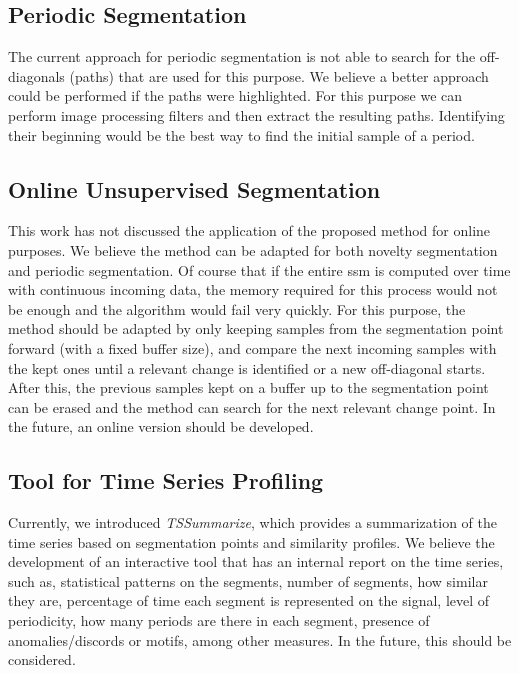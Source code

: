\subsection{Periodic Segmentation}

The current approach for periodic segmentation is not able to search for the off-diagonals (paths) that are used for this purpose. We believe a better approach could be performed if the paths were highlighted. For this purpose we can perform image processing filters and then extract the resulting paths. Identifying their beginning would be the best way to find the initial sample of a period. 

\subsection{Online Unsupervised Segmentation}

This work has not discussed the application of the proposed method for online purposes. We believe the method can be adapted for both novelty segmentation and periodic segmentation. Of course that if the entire \gls{ssm} is computed over time with continuous incoming data, the memory required for this process would not be enough and the algorithm would fail very quickly. For this purpose, the method should be adapted by only keeping samples from the segmentation point forward (with a fixed buffer size), and compare the next incoming samples with the kept ones until a relevant change is identified or a new off-diagonal starts. After this, the previous samples kept on a buffer up to the segmentation point can be erased and the method can search for the next relevant change point. In the future, an online version should be developed.

\subsection{Tool for Time Series Profiling}

Currently, we introduced \textit{TSSummarize}, which provides a summarization of the time series based on segmentation points and similarity profiles. We believe the development of an interactive tool that has an internal report on the time series, such as, statistical patterns on the segments, number of segments, how similar they are, percentage of time each segment is represented on the signal, level of periodicity, how many periods are there in each segment, presence of anomalies/discords or motifs, among other measures. In the future, this should be considered.

